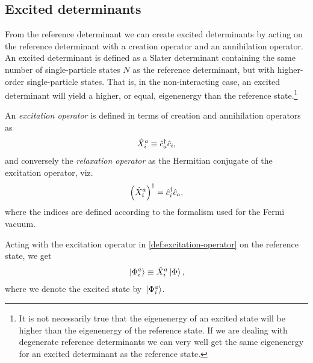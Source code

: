         \subsection{Excited determinants}
            \label{subsec:excited-determinants}
            From the reference determinant we can create excited determinants by
            acting on the reference determinant with a creation operator and an
            annihilation operator.
            An excited determinant is defined as a Slater determinant containing
            the same number of single-particle states $N$ as the reference
            determinant, but with higher-order single-particle states.
            That is, in the non-interacting case, an excited determinant will
            yield a higher, or equal, eigenenergy than the reference
            state.\footnote{%
                It is not necessarily true that the eigenenergy of an excited
                state will be higher than the eigenenergy of the reference
                state. If we are dealing with degenerate reference determinants
                we can very well get the same eigenenergy for an excited
                determinant as the reference state.%
            }
            \begin{definition}
                \label{def:excitation-operator}
                An \emph{excitation operator} is defined in terms of creation
                and annihilation operators as
                \begin{align}
                    \hat{X}^{a}_{i} \equiv \hat{c}_{a}^{\dagger}\hat{c}_{i},
                \end{align}
                and conversely the \emph{relaxation operator} as the Hermitian
                conjugate of the excitation operator, viz.
                \begin{align}
                    \left( \hat{X}^{a}_{i} \right)^{\dagger} = \hat{c}_{i}^{\dagger}\hat{c}_{a},
                \end{align}
                where the indices are defined according to the formalism used
                for the Fermi vacuum.
            \end{definition}
            Acting with the excitation operator in
            \autoref{def:excitation-operator} on the reference state, we get
            \begin{align}
                \ket*{\Phi^{a}_{i}}
                \equiv
                \hat{X}^{a}_{i}\ket*{\Phi},
            \end{align}
            where we denote the excited state by $\ket*{\Phi^{a}_{i}}$.
